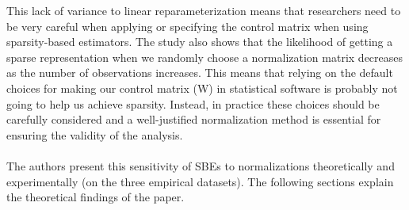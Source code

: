 This lack of variance to linear reparameterization means that researchers need to be very careful when applying or specifying the control matrix when using sparsity-based estimators. The study also shows that the likelihood of getting a sparse representation when we randomly choose a normalization matrix decreases as the number of observations increases. This means that relying on the default choices for making our control matrix (W) in statistical software is probably not going to help us achieve sparsity. Instead, in practice these choices should be carefully considered and a well-justified normalization method is essential for ensuring the validity of the analysis. \\
\\
The authors present this sensitivity of SBEs to normalizations theoretically and experimentally (on the three empirical datasets). The following sections explain the theoretical findings of the paper.